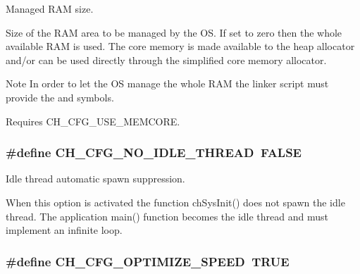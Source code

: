 Managed R\+A\+M size. 

Size of the R\+A\+M area to be managed by the O\+S. If set to zero then the whole available R\+A\+M is used. The core memory is made available to the heap allocator and/or can be used directly through the simplified core memory allocator.

\begin{DoxyNote}{Note}
In order to let the O\+S manage the whole R\+A\+M the linker script must provide the {} and {} symbols. 

Requires {\ttfamily C\+H\+\_\+\+C\+F\+G\+\_\+\+U\+S\+E\+\_\+\+M\+E\+M\+C\+O\+R\+E}. 
\end{DoxyNote}
\hypertarget{group__config_ga8c0d4e5b775c997167737f0ca65eb11e}{
\subsubsection[{C\+H\+\_\+\+C\+F\+G\+\_\+\+N\+O\+\_\+\+I\+D\+L\+E\+\_\+\+T\+H\+R\+E\+A\+D}]{\setlength{\rightskip}{0pt plus 5cm}\#define C\+H\+\_\+\+C\+F\+G\+\_\+\+N\+O\+\_\+\+I\+D\+L\+E\+\_\+\+T\+H\+R\+E\+A\+D~F\+A\+L\+S\+E}}\label{group__config_ga8c0d4e5b775c997167737f0ca65eb11e}


Idle thread automatic spawn suppression. 

When this option is activated the function {\ttfamily ch\+Sys\+Init()} does not spawn the idle thread. The application {\ttfamily main()} function becomes the idle thread and must implement an infinite loop. \hypertarget{group__config_gac7a7942b6c4ef2f79416971688a49c40}{
\subsubsection[{C\+H\+\_\+\+C\+F\+G\+\_\+\+O\+P\+T\+I\+M\+I\+Z\+E\+\_\+\+S\+P\+E\+E\+D}]{\setlength{\rightskip}{0pt plus 5cm}\#define C\+H\+\_\+\+C\+F\+G\+\_\+\+O\+P\+T\+I\+M\+I\+Z\+E\+\_\+\+S\+P\+E\+E\+D~T\+R\+U\+E}}\label{group__config_gac7a7942b6c4ef2f79416971688a49c40}


